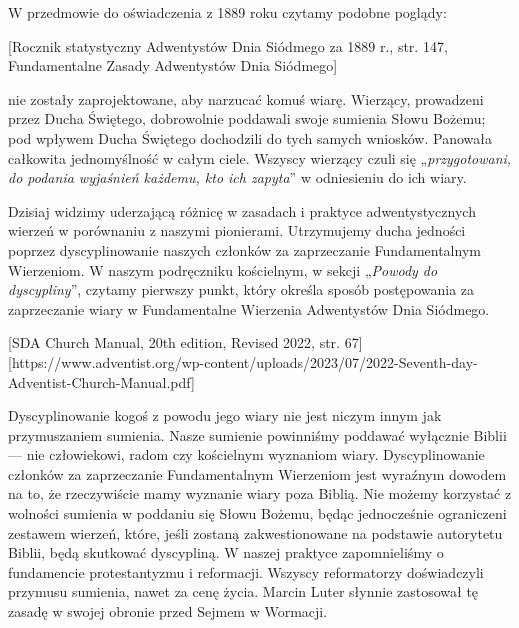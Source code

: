 W przedmowie do oświadczenia z 1889 roku czytamy podobne poglądy:

[Rocznik statystyczny Adwentystów Dnia Siódmego za 1889 r., str. 147, Fundamentalne Zasady Adwentystów Dnia Siódmego]

 nie zostały zaprojektowane, aby narzucać komuś wiarę. Wierzący, prowadzeni przez Ducha Świętego, dobrowolnie poddawali swoje sumienia Słowu Bożemu; pod wpływem Ducha Świętego dochodzili do tych samych wniosków. Panowała całkowita jednomyślność w całym ciele. Wszyscy wierzący czuli się „\textit{przygotowani, do podania wyjaśnień każdemu, kto ich zapyta}” w odniesieniu do ich wiary.

Dzisiaj widzimy uderzającą różnicę w zasadach i praktyce adwentystycznych wierzeń w porównaniu z naszymi pionierami. Utrzymujemy ducha jedności poprzez dyscyplinowanie naszych członków za zaprzeczanie Fundamentalnym Wierzeniom. W naszym podręczniku kościelnym, w sekcji „\textit{Powody do dyscypliny}”, czytamy pierwszy punkt, który określa sposób postępowania za zaprzeczanie wiary w Fundamentalne Wierzenia Adwentystów Dnia Siódmego.


[SDA Church Manual, 20th edition, Revised 2022, str. 67][https://www.adventist.org/wp-content/uploads/2023/07/2022-Seventh-day-Adventist-Church-Manual.pdf]

Dyscyplinowanie kogoś z powodu jego wiary nie jest niczym innym jak przymuszaniem sumienia. Nasze sumienie powinniśmy poddawać wyłącznie Biblii — nie człowiekowi, radom czy kościelnym wyznaniom wiary. Dyscyplinowanie członków za zaprzeczanie Fundamentalnym Wierzeniom jest wyraźnym dowodem na to, że rzeczywiście mamy wyznanie wiary poza Biblią. Nie możemy korzystać z wolności sumienia w poddaniu się Słowu Bożemu, będąc jednocześnie ograniczeni zestawem wierzeń, które, jeśli zostaną zakwestionowane na podstawie autorytetu Biblii, będą skutkować dyscypliną. W naszej praktyce zapomnieliśmy o fundamencie protestantyzmu i reformacji. Wszyscy reformatorzy doświadczyli przymusu sumienia, nawet za cenę życia. Marcin Luter słynnie zastosował tę zasadę w swojej obronie przed Sejmem w Wormacji.

